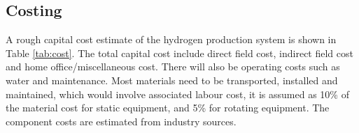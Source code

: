 

\subsection{Costing}
A rough capital cost estimate of the hydrogen production system is shown in Table \ref{tab:cost}. The total capital cost include direct field cost, indirect field cost and home office/miscellaneous cost. There will also be operating costs such as water and maintenance. Most materials need to be transported, installed and maintained, which would involve associated labour cost, it is assumed as 10\% of the material cost for static equipment, and 5\% for rotating equipment. The component costs are estimated from industry sources.\cite{cost} \cite{cost2} \cite{cost3}
